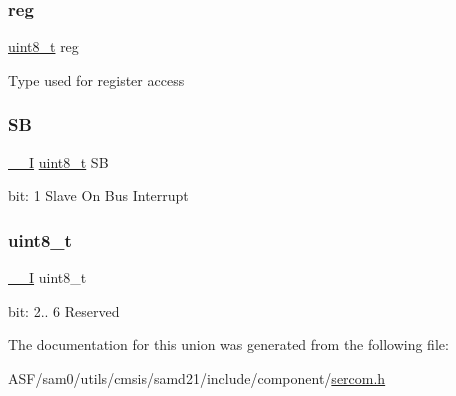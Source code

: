 \subsubsection{\texorpdfstring{reg}{reg}}
{\footnotesize\ttfamily \mbox{\hyperlink{union_s_e_r_c_o_m___i2_c_m___i_n_t_f_l_a_g___type_a5b4208c6f4c4a4290c4f2804d1eb1d5b}{uint8\+\_\+t}} reg}

Type used for register access \mbox{\label{union_s_e_r_c_o_m___i2_c_m___i_n_t_f_l_a_g___type_ac6add1ec2bf6a0ae4dce09e4829d4ef0}} 
\subsubsection{\texorpdfstring{SB}{SB}}
{\footnotesize\ttfamily \mbox{\hyperlink{core__cm0plus_8h_af63697ed9952cc71e1225efe205f6cd3}{\+\_\+\+\_\+I}} \mbox{\hyperlink{union_s_e_r_c_o_m___i2_c_m___i_n_t_f_l_a_g___type_a5b4208c6f4c4a4290c4f2804d1eb1d5b}{uint8\+\_\+t}} SB}

bit\+: 1 Slave On Bus Interrupt \mbox{\label{union_s_e_r_c_o_m___i2_c_m___i_n_t_f_l_a_g___type_a5b4208c6f4c4a4290c4f2804d1eb1d5b}} 
\subsubsection{\texorpdfstring{uint8\_t}{uint8\_t}}
{\footnotesize\ttfamily \mbox{\hyperlink{core__cm0plus_8h_af63697ed9952cc71e1225efe205f6cd3}{\+\_\+\+\_\+I}} uint8\+\_\+t}

bit\+: 2.. 6 Reserved 

The documentation for this union was generated from the following file\+:\begin{DoxyCompactItemize}
\item 
A\+S\+F/sam0/utils/cmsis/samd21/include/component/\mbox{\hyperlink{utils_2cmsis_2samd21_2include_2component_2sercom_8h}{sercom.\+h}}\end{DoxyCompactItemize}

